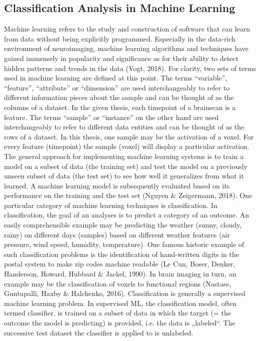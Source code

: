 \documentclass[a4paper, 11pt]{scrreprt}
\begin{document}
\subsection{Classification Analysis in Machine Learning}
Machine learning refers to the study and construction of software that can learn from data without being explicitly programmed. Especially in the data-rich environment of neuroimaging, machine learning algorithms and techniques have gained immensely in popularity and significance as for their ability to detect hidden patterns and trends in the data (Vogt, 2018). For clarity, two sets of terms used in machine learning are defined at this point.
The terms “variable”, “feature”, “attribute” or “dimension” are used interchangeably to refer to different information pieces about the sample and can be thought of as the columns of a dataset. In the given thesis, each timepoint of a brainscan is a feature. The terms “sample” or “instance” on the other hand are used interchangeably to refer to different data entities and can be thought of as the rows of a dataset. In this thesis, one sample may be the activation of a voxel. For every feature (timepoint) the sample (voxel) will display a particular activation.
The general approach for implementing machine learning systems is to train a model on a subset of data (the training set) and test the model on a previously unseen subset of data (the test set) to see how well it generalizes from what it learned. A machine learning model is subsequently evaluated based on its performance on the training and the test set (Nguyen \& Zeigermann, 2018). 
One particular category of machine learning techniques is classification. In classification, the goal of an analyses is to predict a category of an outcome. An easily comprehensible example may be predicting the weather (sunny, cloudy, rainy) on different days (samples) based on different weather features (air pressure, wind speed, humidity, temperature). One famous historic example of such classification problems is the identification of hand-written digits in the postal system to make zip codes machine readable (Le Cun, Boser, Denker, Handerson, Howard, Hubbard \& Jackel, 1990).  In brain imaging in turn, an example may be the classification of voxels to functional regions (Nastase, Guntupalli, Haxby \& Halchenko, 2016). 
Classification is generally a supervised machine learning problem. In supervised ML, the classification model, often termed classifier, is trained on a subset of data in which the target (= the outcome the model is predicting) is provided, i.e. the data is „labeled“. The successive test dataset the classifier is applied to is unlabeled.
\end{document}
